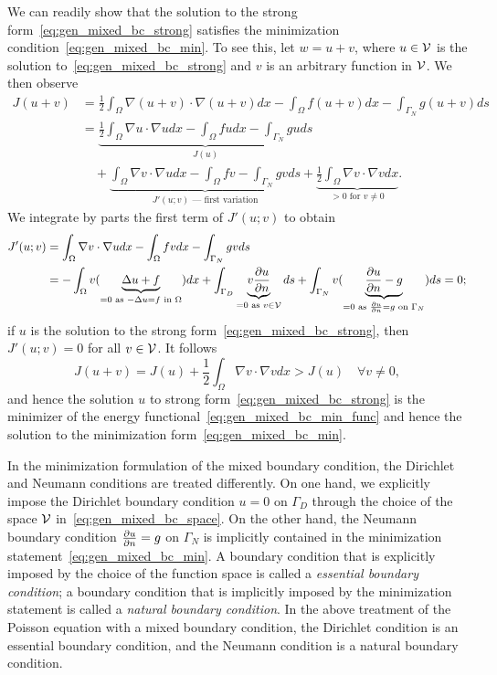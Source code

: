 We can readily show that the solution to the strong form~\eqref{eq:gen_mixed_bc_strong} satisfies the minimization condition~\eqref{eq:gen_mixed_bc_min}. To see this, let $w = u + v$, where $u \in \mathcal{V}$ is the solution to~\eqref{eq:gen_mixed_bc_strong} and $v$ is an arbitrary function in $\mathcal{V}$. We  then observe
\begin{align*}
  J(u + v)
  &=
  \frac{1}{2} \int_\Omega \nabla (u + v) \cdot \nabla (u+v) dx - \int_\Omega f (u+v) dx - \int_{\Gamma_N} g (u + v) ds
  \\
  &= \underbrace{ \frac{1}{2} \int_\Omega \nabla u \cdot \nabla u dx - \int_\Omega fu dx - \int_{\Gamma_N} g u ds }_{J(u)}
  \\
  &\quad + \underbrace{\int_{\Omega} \nabla v \cdot \nabla u dx - \int_\Omega f v - \int_{\Gamma_N} g v ds}_{J'(u;v) \text{ --- first variation}}
  + \underbrace{  \frac{1}{2} \int_{\Omega} \nabla v \cdot \nabla v dx }_{> 0 \text{ for } v \neq 0}.
\end{align*}
We integrate by parts the first term of $J'(u;v)$ to obtain
\begin{align*}
  J'(u;v) &= \int_{\Omega} \nabla v \cdot \nabla u dx - \int_\Omega f v dx - \int_{\Gamma_N} g v ds
  \\
  &= - \int_\Omega v (\underbrace{ \Delta u + f }_{= 0 \text{ as } -\Delta u = f \text{ in } \Omega}) dx + \int_{\Gamma_D} \underbrace{ v \frac{\partial u}{\partial n} }_{=0 \text{ as } v \in \mathcal{V}}ds + \int_{\Gamma_N}  v (\underbrace{ \frac{\partial u}{\partial n} - g }_{= 0 \text{ as } \frac{\partial u}{\partial n} = g \text{ on } \Gamma_N}) ds = 0;
\end{align*}
if $u$ is the solution to the strong form~\eqref{eq:gen_mixed_bc_strong}, then $J'(u;v) = 0$ for all $v \in \mathcal{V}$. It follows
\begin{equation*}
  J(u+v) = J(u) + \frac{1}{2} \int_\Omega \nabla v \cdot \nabla v dx > J(u) \quad \forall v \neq 0,
\end{equation*}
and hence the solution $u$ to strong form~\eqref{eq:gen_mixed_bc_strong} is the minimizer of the energy functional~\eqref{eq:gen_mixed_bc_min_func} and hence the solution to the minimization form~\eqref{eq:gen_mixed_bc_min}.

In the minimization formulation of the mixed boundary condition, the Dirichlet and Neumann conditions are treated differently.  On one hand, we explicitly impose the Dirichlet boundary condition $u = 0$ on $\Gamma_D$ through the choice of the space $\mathcal{V}$ in~\eqref{eq:gen_mixed_bc_space}. On the other hand, the Neumann boundary condition $\frac{\partial u}{\partial n} = g$ on $\Gamma_N$ is implicitly contained in the minimization statement~\eqref{eq:gen_mixed_bc_min}.  A boundary condition that is explicitly imposed by the choice of the function space is called a \emph{essential boundary condition}; a boundary condition that is implicitly imposed by the minimization statement is called a \emph{natural boundary condition}.  In the above treatment of the Poisson equation with a mixed boundary condition, the Dirichlet condition is an essential boundary condition, and the Neumann condition is a natural boundary condition.

